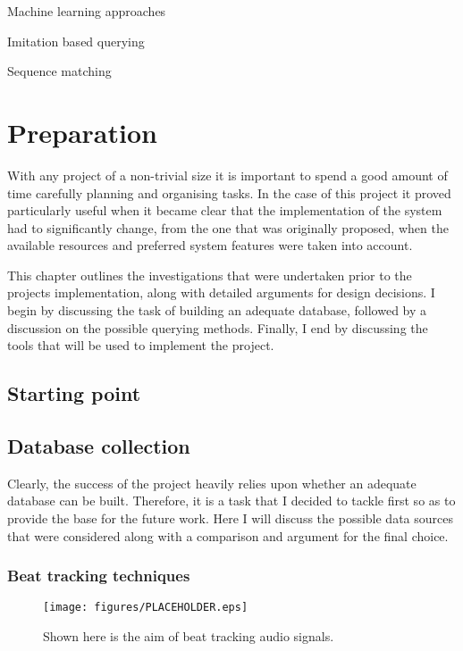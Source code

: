 \documentclass[12pt,twoside,notitlepage]{report}
\begin{document}
	Machine learning approaches

	Imitation based querying

	Sequence matching

\cleardoublepage

\chapter{Preparation}

	With any project of a non-trivial size it is important to spend a good amount of time carefully planning and organising tasks. In the case of this project it proved particularly useful when it became clear that the implementation of the system had to significantly change, from the one that was originally proposed, when the available resources and preferred system features were taken into account.
	
	This chapter outlines the investigations that were undertaken prior to the projects implementation, along with detailed arguments for design decisions. I begin by discussing the task of building an adequate database, followed by a discussion on the possible querying methods. Finally, I end by discussing the tools that will be used to implement the project.
	
	
	\section{Starting point}
	\section{Database collection}
	
	Clearly, the success of the project heavily relies upon whether an adequate database can be built. Therefore, it is a task that I decided to tackle first so as to provide the base for the future work. Here I will discuss the possible data sources that were considered along with a comparison and argument for the final choice.
	
		\subsection{Beat tracking techniques}
		
		\begin{figure}[h]
			\centerline{\texttt{[image: figures/PLACEHOLDER.eps]}}
			\caption{\label{beatTracking} Shown here is the aim of beat tracking audio signals.}
\end{figure}
\end{document}

